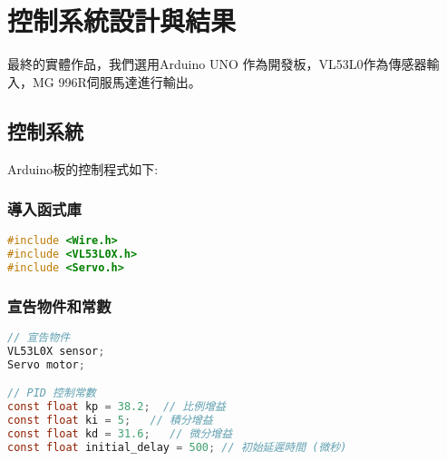 \newpage
\section{控制系統設計與結果}
	最終的實體作品，我們選用Arduino UNO 作為開發板，VL53L0作為傳感器輸入，MG 996R伺服馬達進行輸出。



\subsection{控制系統}
Arduino板的控制程式如下:





\subsubsection{導入函式庫}
\begin{lstlisting}[language=C]
#include <Wire.h>
#include <VL53L0X.h>
#include <Servo.h>


\end{lstlisting}

\subsubsection{宣告物件和常數}
\begin{lstlisting}[language=C]
// 宣告物件
VL53L0X sensor;
Servo motor;

// PID 控制常數
const float kp = 38.2;  // 比例增益
const float ki = 5;   // 積分增益
const float kd = 31.6;   // 微分增益
const float initial_delay = 500; // 初始延遲時間 (微秒)


\end{lstlisting}

